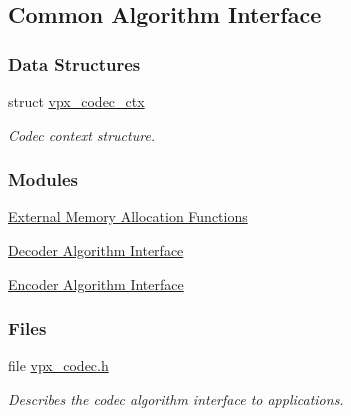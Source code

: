 \hypertarget{group__codec}{\subsection{\-Common \-Algorithm \-Interface}
\label{group__codec}
}
\subsubsection*{\-Data \-Structures}
\begin{DoxyCompactItemize}
\item 
struct \hyperlink{structvpx__codec__ctx}{vpx\-\_\-codec\-\_\-ctx}
\begin{DoxyCompactList}\small\item\em \-Codec context structure. \end{DoxyCompactList}\end{DoxyCompactItemize}
\subsubsection*{\-Modules}
\begin{DoxyCompactItemize}
\item 
\hyperlink{group__cap__xma}{\-External Memory Allocation Functions}
\item 
\hyperlink{group__decoder}{\-Decoder Algorithm Interface}
\item 
\hyperlink{group__encoder}{\-Encoder Algorithm Interface}
\end{DoxyCompactItemize}
\subsubsection*{\-Files}
\begin{DoxyCompactItemize}
\item 
file \hyperlink{vpx__codec_8h}{vpx\-\_\-codec.\-h}
\begin{DoxyCompactList}\small\item\em \-Describes the codec algorithm interface to applications. \end{DoxyCompactList}\end{DoxyCompactItemize}
